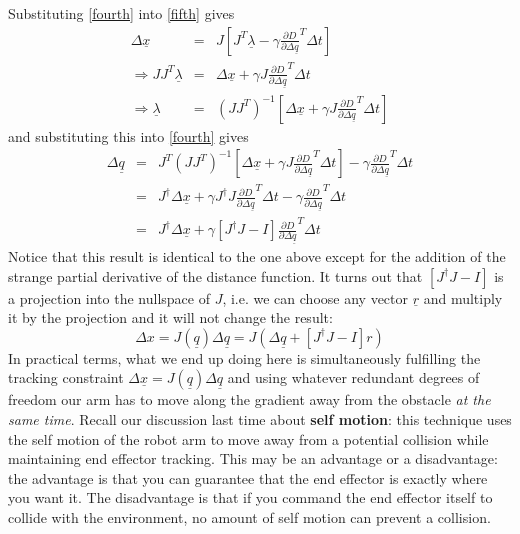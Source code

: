 \documentclass[]{article}
\begin{document}
Substituting \ref{fourth} into \ref{fifth} gives
\begin{eqnarray}
    \Delta\underline{x}	& = & J\left[J^{T}\underline{\lambda} - \gamma \frac{\partial D}{\partial \Delta\underline{q}}^{T}\Delta t \right] \nonumber \\
    \Rightarrow JJ^{T}\underline{\lambda} & = & \Delta\underline{x} + \gamma J \frac{\partial D}{\partial \Delta\underline{q}}^{T}\Delta t \nonumber \\
    \Rightarrow \underline{\lambda} & = & (JJ^{T})^{-1}\left[\Delta\underline{x} + \gamma J \frac{\partial D}{\partial \Delta\underline{q}}^{T}\Delta t\right] \nonumber
\end{eqnarray}
and substituting this into \ref{fourth} gives
\begin{eqnarray}
    \Delta\underline{q} & = & J^{T}(JJ^{T})^{-1}\left[\Delta\underline{x} + \gamma J \frac{\partial D}{\partial \Delta\underline{q}}^{T}\Delta t\right] - \gamma \frac{\partial D}{\partial \Delta\underline{q}}^{T}\Delta t \nonumber \\
    & = & J^{\dag} \Delta\underline{x} + \gamma J^{\dag} J \frac{\partial D}{\partial \Delta\underline{q}}^{T}\Delta t  -\gamma \frac{\partial D}{\partial \Delta\underline{q}}^{T}\Delta t \nonumber \\
    & = & J^{\dag} \Delta\underline{x} + \gamma \left[J^{\dag}J - I\right] \frac{\partial D}{\partial \Delta\underline{q}}^{T}\Delta t 
\end{eqnarray}
Notice that this result is identical to the one above except for the addition of the strange partial derivative of the distance function. It turns out that $\left[J^{\dag}J - I\right]$ is a projection into the nullspace of $J$, i.e. we can choose any vector $\underline{r}$ and multiply it by the projection and it will not change the result:
\begin{displaymath}
   \Delta{x} = J(\underline{q})\Delta\underline{q} = J\left(\Delta\underline{q} + \left[J^{\dag}J - I\right] r\right)
\end{displaymath}
In practical terms, what we end up doing here is simultaneously fulfilling the tracking constraint $\Delta\underline{x} = J(\underline{q})\Delta\underline{q}$ and using whatever redundant degrees of freedom our arm has to move along the gradient away from the obstacle \textit{at the same time}. Recall our discussion last time about \textbf{self motion}: this technique uses the self motion of the robot arm to move away from a potential collision while maintaining end effector tracking. This may be an advantage or a disadvantage: the advantage is that you can guarantee that the end effector is exactly where you want it. The disadvantage is that if you command the end effector itself to collide with the environment, no amount of self motion can prevent a collision.
\end{document}
